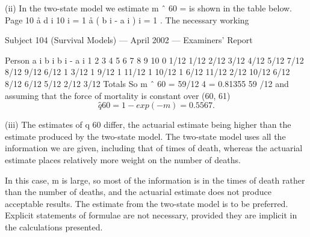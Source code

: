 \documentclass[a4paper,12pt]{article}
\begin{document}
(ii)
In the two-state model we estimate m ˆ 60 =
is shown in the table below.
Page 10
å d i
10
i = 1
å ( b i - a i )
i = 1
. The necessary working

Subject 104 (Survival Models) — April 2002 — Examiners’ Report

Person a i b i b i - a i
1
2
3
4
5
6
7
8
9
10 0
1/12
1/12
2/12
3/12
4/12
5/12
7/12
8/12
9/12 6/12
1
3/12
1
9/12
1
11/12
1
10/12
1 6/12
11/12
2/12
10/12
6/12
8/12
6/12
5/12
2/12
3/12
Totals
So m ˆ 60 =
59/12
4
= 0.81355
59 /12
and assuming that the force of mortality is constant over (60, 61)
\[q̂ 60 = 1 - exp( -m ) = 0.5567.\]

(iii)
The estimates of q 60 differ, the actuarial estimate being higher than the estimate produced by the two-state model.
The two-state model uses all the information we are given, including that of times of death, whereas the actuarial estimate places relatively more weight on the number of deaths.

In this case, m is large, so most of the information is in the times of death rather than the number of deaths, and the actuarial estimate does not produce acceptable results. The estimate from the two-state model is to be preferred.
Explicit statements of formulae are not necessary, provided they are implicit in the
calculations presented. 

\end{document}
